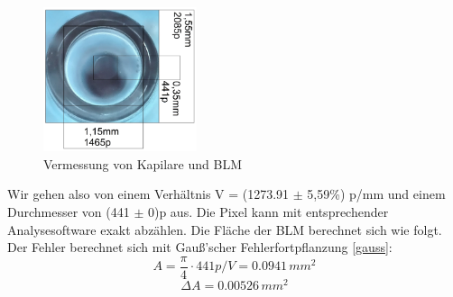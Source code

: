 \documentclass{include/thesisclass3}
\newcommand{\e}[1]{\,\si{#1}}
\begin{document}
\begin{figure}[ht]
	\begin{center}
		\includegraphics[width=0.4\textwidth]{images/Perle2.png}
		\caption{Vermessung von Kapilare und BLM}
		\label{Perle}
	\end{center}
\end{figure}
Wir gehen also von einem Verhältnis V = (1273.91 $\pm$ 5,59\%) p/mm und einem Durchmesser von (441 $\pm$ 0)p aus. Die Pixel kann mit entsprechender Analysesoftware exakt abzählen. Die Fläche der BLM berechnet sich wie folgt. Der Fehler berechnet sich mit Gau\ss'scher Fehlerfortpflanzung \ref{gauss}:
\begin{equation}
A=\frac{\pi}{4}\cdot 441p/ V=0.0941\e{mm^2}
\end{equation}
\begin{equation}
\Delta A=0.00526\e{mm^2}
\end{equation}
\end{document}
